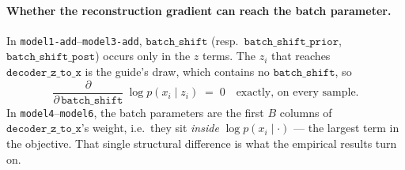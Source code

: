 \documentclass[11pt]{article}
\newcommand{\deczx}{\texttt{decoder\_z\_to\_x}}
\newcommand{\bshift}{\texttt{batch\_shift}}
\newcommand{\bprior}{\texttt{batch\_shift\_prior}}
\newcommand{\bpost}{\texttt{batch\_shift\_post}}
\begin{document}
\paragraph{Whether the reconstruction gradient can reach the batch parameter.}
In \texttt{model1-add}--\texttt{model3-add}, $\bshift$ (resp.\ $\bprior$, $\bpost$) occurs only
in the $z$ terms. The $z_i$ that reaches $\deczx$ is the guide's draw, which contains no
$\bshift$, so
\begin{equation}
\frac{\partial}{\partial\, \bshift}\ \log p(x_i \mid z_i) \;=\; 0
\quad\text{exactly, on every sample.}
\end{equation}
In \texttt{model4}--\texttt{model6}, the batch parameters are the first $B$ columns of
$\deczx$'s weight, i.e.\ they sit \emph{inside} $\log p(x_i \mid \cdot)$ --- the largest term
in the objective. That single structural difference is what the empirical results turn on.
\end{document}
